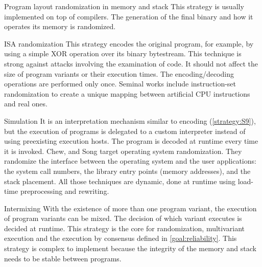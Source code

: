 \begin{strategy}{Program layout randomization in memory and stack}
    \label{strategy:S7}
    \normalfont
    This strategy is usually implemented on top of compilers. The generation of the final binary and how it operates its memory is randomized.  %
\end{strategy}


\begin{strategy}{ISA randomization}
    \label{strategy:S8}
    \normalfont
    This strategy encodes the original program, for example, by using a simple XOR operation over its binary bytestream. This technique is strong against attacks involving the examination of code. It should not affect the size of program variants or their execution times. The encoding/decoding operations are performed only once. 
    Seminal works include instruction-set randomization \cite{Kc03,barrantes2003randomized}
    to create a unique mapping between artificial CPU instructions and real ones.
\end{strategy}


\begin{strategy}{Simulation}
    \label{strategy:S9}
    \normalfont
    It is an interpretation mechanism similar to encoding (\autoref{strategy:S9}), but the execution of programs is delegated to a custom interpreter instead of using preexisting execution hosts. The program is decoded at runtime every time it is invoked. 
    Chew, and Song \cite{Chew02mitigatingbuffer} target operating system randomization. They randomize the interface between the operating system and the user applications:
    the system call numbers, the library entry points (memory addresses), and the stack placement. All those techniques are dynamic, done at runtime using load-time preprocessing and rewriting. 
\end{strategy}


\begin{strategy}{Intermixing}
    \label{strategy:S10}
    \normalfont
    With the existence of more than one program variant, the execution of program variants can be mixed. The decision of which variant executes is decided at runtime. This strategy is the core for randomization, multivariant execution and the execution by consensus defined in \autoref{goal:reliability}. This strategy is 
    complex to implement because the integrity of the memory and stack needs to be stable between programs.
\end{strategy}

